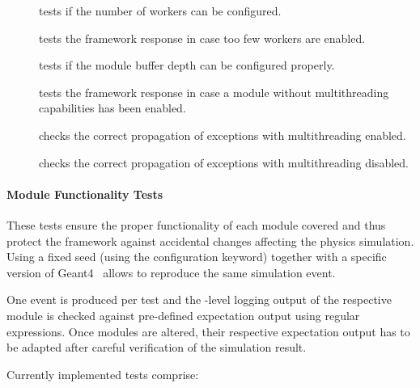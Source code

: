 \begin{description}
    \item[] tests if the number of workers can be configured.
    \item[] tests the framework response in case too few workers are enabled.
    \item[] tests if the module buffer depth can be configured properly.
    \item[] tests the framework response in case a module without multithreading capabilities has been enabled.
    \item[] checks the correct propagation of exceptions with multithreading enabled.
    \item[] checks the correct propagation of exceptions with multithreading disabled.
\end{description}


\paragraph{Module Functionality Tests}

These tests ensure the proper functionality of each module covered and thus protect the framework against accidental changes affecting the physics simulation.
Using a fixed seed (using the  configuration keyword) together with a specific version of Geant4~\cite{geant4} allows to reproduce the same simulation event.

One event is produced per test and the -level logging output of the respective module is checked against pre-defined expectation output using regular expressions.
Once modules are altered, their respective expectation output has to be adapted after careful verification of the simulation result.

Currently implemented tests comprise:


